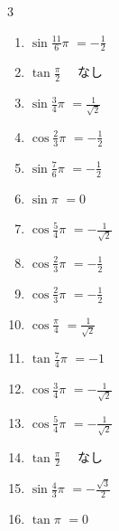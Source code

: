 \begin{multicols}{3}
\begin{enumerate}
  \item $\displaystyle \sin{\frac{11}{6}\pi}$
        $\displaystyle =-\frac{1}{2}$

  \item $\displaystyle \tan{\frac{\pi}{2}}$
        $\displaystyle \quad なし$

  \item $\displaystyle \sin{\frac{3}{4}\pi}$
        $\displaystyle =\frac{1}{\sqrt{2}}$

  \item $\displaystyle \cos{\frac{2}{3}\pi}$
        $\displaystyle =-\frac{1}{2}$

  \item $\displaystyle \sin{\frac{7}{6}\pi}$
        $\displaystyle =-\frac{1}{2}$

  \item $\displaystyle \sin{\pi}$
        $\displaystyle =0$

  \item $\displaystyle \cos{\frac{5}{4}\pi}$
        $\displaystyle =-\frac{1}{\sqrt{2}}$

\columnbreak %

  \item $\displaystyle \cos{\frac{2}{3}\pi}$
        $\displaystyle =-\frac{1}{2}$

  \item $\displaystyle \cos{\frac{2}{3}\pi}$
        $\displaystyle =-\frac{1}{2}$

  \item $\displaystyle \cos{\frac{\pi}{4}}$
        $\displaystyle =\frac{1}{\sqrt{2}}$

  \item $\displaystyle \tan{\frac{7}{4}\pi}$
        $\displaystyle =-1$

  \item $\displaystyle \cos{\frac{3}{4}\pi}$
        $\displaystyle =-\frac{1}{\sqrt{2}}$

  \item $\displaystyle \cos{\frac{5}{4}\pi}$
        $\displaystyle =-\frac{1}{\sqrt{2}}$

  \item $\displaystyle \tan{\frac{\pi}{2}}$
        $\displaystyle \quad なし$

  \item $\displaystyle \sin{\frac{4}{3}\pi}$
        $\displaystyle =-\frac{\sqrt{3}}{2}$

  \item $\displaystyle \tan{\pi}$
        $\displaystyle =0$


\end{enumerate}
\end{multicols}
